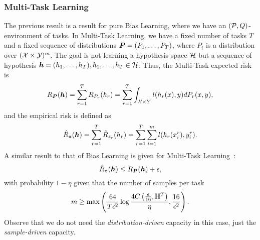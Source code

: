 \subsubsection*{Multi-Task Learning}
The previous result is a result for pure Bias Learning, where we have an $(\mathcal{P}, Q)$-environment of tasks. In Multi-Task Learning, we have a fixed number of tasks $T$ and a fixed sequence of distributions $\bm{P} = (P_1, \ldots, P_T)$, where $P_i$ is a distribution over $(\mathcal{X} \times \mathcal{Y})^m$. The goal is not learning a hypothesis space $\mathcal{H}$ but a sequence of hypothesis $\bm{h} = (h_1, \ldots, h_T), h_1, \ldots, h_T \in \mathcal{H} $. Thus, the Multi-Task expected risk is
\begin{equation}\label{eq:mtlearn_exprisk}
    \risk_{\bprobseq}(\myvec{\hypf}) = \sum_{r=1}^\ntasks \risk_{P_r}(\hypf_r)  = \sum_{r=1}^\ntasks \int_{\Xspace \times Y} l(\hypf_r(x), y) d{P_r}(x, y),
\end{equation}
and the empirical risk is defined as
\begin{equation}\label{eq:mtlearn_emprisk}
    \bemprisk(\myvec{\hypf}) = \sum_{r=1}^\ntasks \hat{\risk}_{\sample_r}(\hypf_r) = \sum_{r=1}^\ntasks \sum_{i=1}^m l(\hypf_r(x_i^r), y_i^r).
\end{equation}
A similar result to that of Bias Learning is given for Multi-Task Learning~\cite[Theorem~4]{baxter2000model}:
\begin{equation}
    \nonumber
    \hat{R}_{\bm{z}}(\bm{h}) \leq R_{\bm{P}}(\bm{h}) + \epsilon,
\end{equation}
with probability $1 - \eta$ given that the number of samples per task
\begin{equation}
    \nonumber
    m \geq \max \left( \frac{64}{T \epsilon^2} \log\frac{4C\left(\frac{\epsilon}{16}, \mathbb{H}^{T}\right)}{\eta} , \frac{16}{\epsilon^2}\right).
\end{equation}
Observe that we do not need the \emph{distribution-driven} capacity in this case, just the \emph{sample-driven} capacity.

